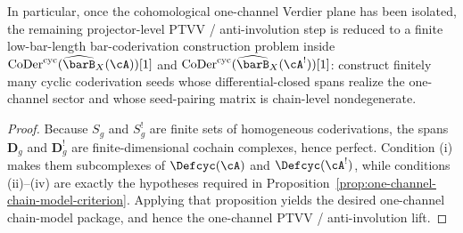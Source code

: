 \begin{proposition}
In particular, once the cohomological one-channel Verdier plane has
been isolated, the remaining projector-level PTVV / anti-involution
step is reduced to a finite low-bar-length bar-coderivation
construction problem inside
$\operatorname{CoDer}^{\mathrm{cyc}}(\widehat{\barB}_X(\cA))[1]$ and
$\operatorname{CoDer}^{\mathrm{cyc}}(\widehat{\barB}_X(\cA^!))[1]$:
construct finitely many cyclic coderivation seeds whose
differential-closed spans realize the one-channel sector and whose
seed-pairing matrix is chain-level nondegenerate.
\end{proposition}

\begin{proof}
Because $S_g$ and $S_g^!$ are finite sets of homogeneous
coderivations, the spans $\mathbf{D}_g$ and $\mathbf{D}_g^!$ are
finite-dimensional cochain complexes, hence perfect.  Condition
\textup{(i)} makes them subcomplexes of
$\Defcyc(\cA)$ and $\Defcyc(\cA^!)$, while conditions
\textup{(ii)}--\textup{(iv)} are exactly the hypotheses required in
Proposition~\ref{prop:one-channel-chain-model-criterion}.  Applying
that proposition yields the desired one-channel chain-model package,
and hence the one-channel PTVV / anti-involution lift.
\end{proof}

